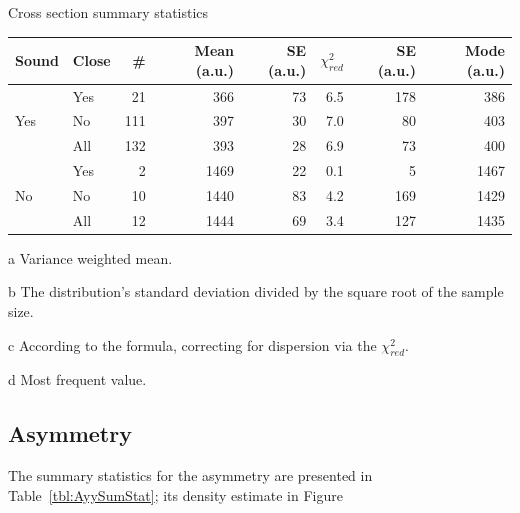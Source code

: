 \documentclass{report}
\begin{document}
\begin{threeparttable}[H]
	\centering
	\caption{Cross section summary statistics\label{tbl:CS0SumStat}}
	\begin{tabular}{llrrrrrr}
		\hline\hline
		Sound                & Close &  \# & Mean\tnote{a} (a.u.) & SE\tnote{b} (a.u.) & $\chi^2_{red}$ & SE\tnote{c} (a.u.) &  Mode\tnote{d} (a.u.)\\ \hline
		\multirow{3}{*}{Yes} & Yes   &  21 &                  366 &                 73 &            6.5 &                178 &  386 \\
		                     & No    & 111 &                  397 &                 30 &            7.0 &                 80 &  403 \\
		                     & All   & 132 &                  393 &                 28 &            6.9 &                 73 &  400 \\ \hline
		\multirow{3}{*}{No}  & Yes   &   2 &                 1469 &                 22 &            0.1 &                  5 & 1467 \\
		                     & No    &  10 &                 1440 &                 83 &            4.2 &                169 & 1429 \\
		                     & All   &  12 &                 1444 &                 69 &            3.4 &                127 & 1435 \\ \hline
	\end{tabular}
	\begin{tablenotes}
		\item[a]{Variance weighted mean.}
		\item[b]{The distribution's standard deviation divided by the square root of the sample size.}
		\item[c]{According to the formula, correcting for dispersion via the $\chi^2_{red}$.}
		\item[d]{Most frequent value.}
	\end{tablenotes}
\end{threeparttable}

\subsection{Asymmetry}

The summary statistics for the asymmetry are presented in Table~\ref{tbl:AyySumStat}; its density estimate in Figure~
\end{document}
